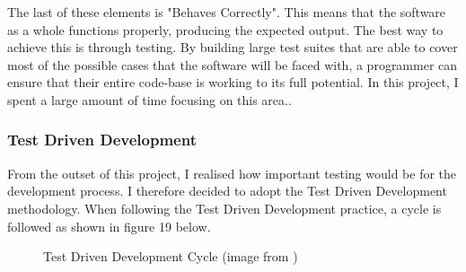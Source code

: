 The last of these elements is "Behaves Correctly". This means that the software as a whole functions properly, producing the expected output. The best way to achieve this is through testing. By building large test suites that are able to cover most of the possible cases that the software will be faced with, a programmer can ensure that their entire code-base is working to its full potential. In this project, I spent a large amount of time focusing on this area..

\subsubsection{Test Driven Development \label{TDD}}
From the outset of this project, I realised how important testing would be for the development process. I therefore decided to adopt the Test Driven Development methodology. When following the Test Driven Development practice, a cycle is followed as shown in figure 19 below.

\begin{figure}[!ht]
	\centering
	\caption{Test Driven Development Cycle (image from \cite{SED})}
\end{figure}

